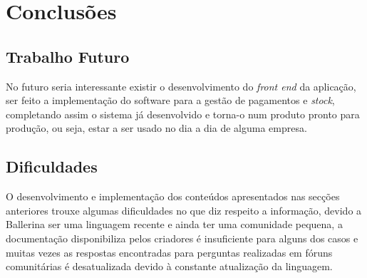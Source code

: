 
\chapter{Conclusões} 	%
\label{Chapter7} 		%




\section{Trabalho Futuro}
No futuro seria interessante existir o desenvolvimento do \textit{front end} da aplicação, ser feito a implementação do software para a gestão de pagamentos e \textit{stock}, completando assim o sistema já desenvolvido e torna-o num produto pronto para produção, ou seja, estar a ser usado no dia a dia de alguma empresa.

\section{Dificuldades}
O desenvolvimento e implementação dos conteúdos apresentados nas secções anteriores trouxe algumas dificuldades no que diz respeito a informação, devido a Ballerina ser uma linguagem recente e ainda ter uma comunidade pequena, a documentação disponibiliza pelos criadores é insuficiente para alguns dos casos e muitas vezes as respostas encontradas para perguntas realizadas em fóruns comunitárias é desatualizada devido à constante atualização da linguagem.


\label{sec:Ch6.1}






